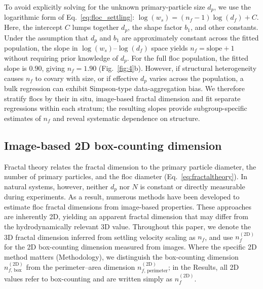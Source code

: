 \documentclass{agujournal2019}
\begin{document}
To avoid explicitly solving for the unknown primary-particle size $d_p$, we use the logarithmic form of Eq.~\eqref{eq:floc_settling}: $\log(w_s) = (n_f - 1)\log(d_f) + C$. Here, the intercept $C$ lumps together $d_p$, the shape factor $b_1$, and other constants. Under the assumption that \(d_p\) and \(b_1\) are approximately constant across the fitted population, the slope in \(\log(w_s)\)--\(\log(d_f)\) space yields \(n_f = \text{slope} + 1\) without requiring prior knowledge of \(d_p\). For the full floc population, the fitted slope is \(0.90\), giving \(n_f = 1.90\) (Fig.~\ref{fig:4}b). However, if structural heterogeneity causes \(n_f\) to covary with size, or if effective \(d_p\) varies across the population, a bulk regression can exhibit Simpson-type data-aggregation bias. We therefore stratify flocs by their in situ, image-based fractal dimension and fit separate regressions within each stratum; the resulting slopes provide subgroup-specific estimates of \(n_f\) and reveal systematic dependence on structure.

\subsection{Image-based 2D box-counting dimension}

Fractal theory relates the fractal dimension to the primary particle diameter, the number of primary particles, and the floc diameter (Eq.~\eqref{eq:fractaltheory}). In natural systems, however, neither $d_p$ nor $N$ is constant or directly measurable during experiments. As a result, numerous methods have been developed to estimate floc fractal dimensions from image-based properties. These approaches are inherently 2D, yielding an apparent fractal dimension that may differ from the hydrodynamically relevant 3D value. Throughout this paper, we denote the 3D fractal dimension inferred from settling velocity scaling as $n_f$, and use $n_f^{(\mathrm{2D})}$ for the 2D box-counting dimension measured from images. Where the specific 2D method matters (Methodology), we distinguish the box-counting dimension $n_{f,\,\mathrm{box}}^{(\mathrm{2D})}$ from the perimeter--area dimension $n_{f,\,\mathrm{perimeter}}^{(\mathrm{2D})}$; in the Results, all 2D values refer to box-counting and are written simply as $n_f^{(\mathrm{2D})}$.
\end{document}
